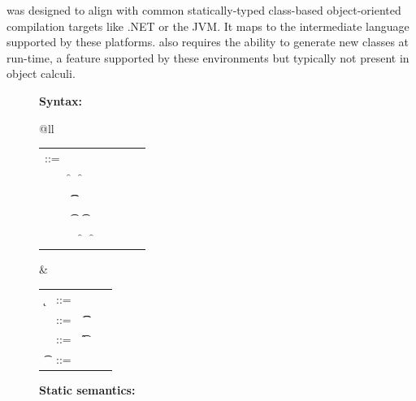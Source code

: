 \documentclass[USenglish]{tex/lipics-v2016}f
\begin{document}
\kafka was designed to align with common statically-typed class-based
object-oriented compilation targets like .NET or the JVM. It maps to the
intermediate language supported by these platforms. \kafka also requires the
ability to generate new classes at run-time, a feature supported by these
environments but typically not present in object calculi.


\begin{figure}[!h]\small\noindent\hrulefill

\vspace{4mm}
{\bf Syntax:}
\vspace{2mm}

\begin{tabular}{@{}ll}\hspace{5mm}\begin{minipage}{7.2cm}\begin{tabular}{@{}l@{~}l@{}l@{}l@{}l@{}l@{}l@{}l}
\e\hspace{.1cm} ::=  \hspace{.2cm} 
 & \x       &\B \this       &\B \that  & \B   \\
 & \FRead\f &\B \FWrite\f\e &\B \New\C{\e[1]..} &\B\\
 & \KCall\e\m\e\t\t   &\B \DynCall\e\m\e &\B\\
 & \SubCast\t\e  &\B \BehCast\t\e & \B \\
 &  \a  &\B \FReadR\a\f &\B \FWriteR\a\f\e 
\end{tabular}\end{minipage}&
\begin{minipage}{2.4cm}\begin{tabular}{l@{~}l@{}l@{}l}
  \k &::= \Class \C {\fd[1]..}{\md[1]..} \\
 \md &::= ~ \Mdef\m\x\t\t\e \\ 
 \fd &::= ~ \Fdef\f\t \\ 
  \t &::= ~ \any  \B   \C  \\ 
\end{tabular}\end{minipage}\end{tabular}

\vspace{6mm}
{\bf Static semantics:}
\vspace{-2mm}

\begin{mathpar}


\end{mathpar}
\end{figure}
\end{document}

